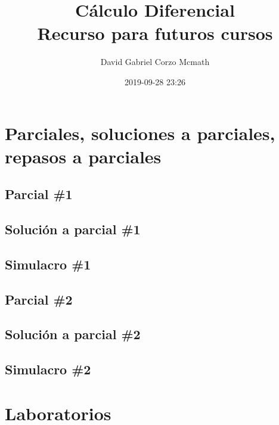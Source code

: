 \documentclass{book}
\author{David Gabriel Corzo Mcmath}
\title{\Huge Cálculo Diferencial \normalsize \\ Recurso para futuros cursos}
\date{2019-09-28 23:26}
\begin{document}
\maketitle
\tableofcontents


\part{Parciales, soluciones a parciales, repasos a parciales}

\chapter{Parcial \#1}


\chapter{Solución a parcial \#1}


\chapter{Simulacro \#1}



\chapter{Parcial \#2}


\chapter{Solución a parcial \#2}


\chapter{Simulacro \#2}


\part{Laboratorios}
\end{document}
